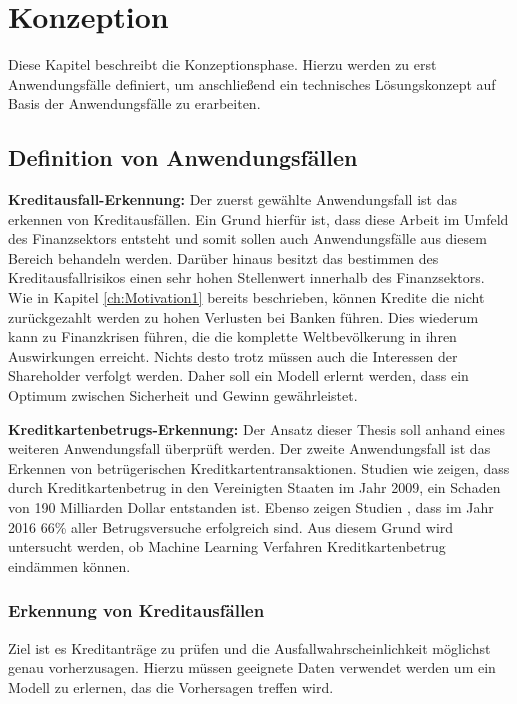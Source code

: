 \chapter{Konzeption}
\label{ch:Konzeption3}

Diese Kapitel beschreibt die Konzeptionsphase. Hierzu werden zu erst Anwendungsfälle definiert, um anschließend ein technisches Lösungskonzept auf Basis der Anwendungsfälle zu erarbeiten. 

\section{Definition von Anwendungsfällen}
\label{sec:Anwendungsfalle3}

\textbf{Kreditausfall-Erkennung:} Der zuerst gewählte Anwendungsfall ist das erkennen von Kreditausfällen. Ein Grund hierfür ist, dass diese Arbeit im Umfeld des Finanzsektors entsteht und somit sollen auch Anwendungsfälle aus diesem Bereich behandeln werden. Darüber hinaus besitzt das bestimmen des Kreditausfallrisikos einen sehr hohen Stellenwert innerhalb des Finanzsektors. Wie in Kapitel \ref{ch:Motivation1} bereits beschrieben, können Kredite die nicht zurückgezahlt werden zu hohen Verlusten bei Banken führen. Dies wiederum kann zu Finanzkrisen führen, die die komplette Weltbevölkerung in ihren Auswirkungen erreicht. Nichts desto trotz müssen auch die Interessen der Shareholder verfolgt werden. Daher soll ein Modell erlernt werden, dass ein Optimum zwischen Sicherheit und Gewinn gewährleistet. 

\textbf{Kreditkartenbetrugs-Erkennung:} Der Ansatz dieser Thesis soll anhand eines weiteren Anwendungsfall überprüft werden. Der zweite Anwendungsfall ist das Erkennen von betrügerischen Kreditkartentransaktionen. Studien wie \cite{FB11} zeigen, dass durch Kreditkartenbetrug in den Vereinigten Staaten im Jahr 2009, ein Schaden von 190 Milliarden Dollar entstanden ist. Ebenso zeigen Studien \cite[vgl. S. 24]{LE16}, dass im Jahr 2016 66\% aller Betrugsversuche erfolgreich sind. Aus diesem Grund wird untersucht werden, ob Machine Learning Verfahren Kreditkartenbetrug eindämmen können.   

\subsection{Erkennung von Kreditausfällen}
\label{subsec:Kreditausfallen3}

Ziel ist es Kreditanträge zu prüfen und die Ausfallwahrscheinlichkeit möglichst genau vorherzusagen. Hierzu müssen geeignete Daten verwendet werden um ein Modell zu erlernen, das die Vorhersagen treffen wird.

